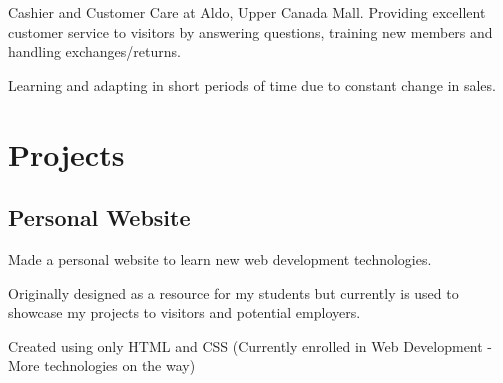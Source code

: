 \documentclass[]{dans-resume}
\begin{document}
\begin{minipage}[t]{0.66\textwidth}
\begin{tightemize}\item Cashier and Customer Care at Aldo, Upper Canada Mall.
  Providing excellent customer service to visitors by answering questions, training new members
  and handling exchanges/returns.
  \item Learning and adapting in short periods of time due to constant change in sales.
\end{tightemize}


\section{Projects}

\subsection{Personal Website}
\vspace{\topsep}
\begin{tightemize}\item Made a personal website to learn new web development technologies.
\item Originally designed as a resource for my students but currently is used to  showcase
my projects to visitors and potential employers.
\item Created using only HTML and CSS (Currently enrolled in Web Development - More
technologies on the way)
\end{tightemize}
\sectionsep



\end{minipage}
\end{document}
